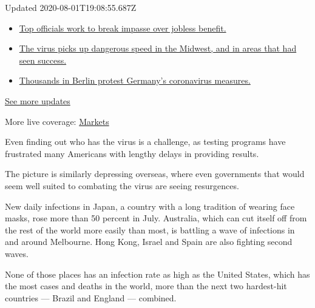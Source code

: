 Updated 2020-08-01T19:08:55.687Z

\begin{itemize}
\tightlist
\item
  \href{https://www.nytimes3xbfgragh.onion/2020/08/01/world/coronavirus-covid-19.html?action=click\&pgtype=Article\&state=default\&region=MAIN_CONTENT_1\&context=storylines_live_updates\#link-3ac56579}{Top
  officials work to break impasse over jobless benefit.}
\item
  \href{https://www.nytimes3xbfgragh.onion/2020/08/01/world/coronavirus-covid-19.html?action=click\&pgtype=Article\&state=default\&region=MAIN_CONTENT_1\&context=storylines_live_updates\#link-8796723}{The
  virus picks up dangerous speed in the Midwest, and in areas that had
  seen success.}
\item
  \href{https://www.nytimes3xbfgragh.onion/2020/08/01/world/coronavirus-covid-19.html?action=click\&pgtype=Article\&state=default\&region=MAIN_CONTENT_1\&context=storylines_live_updates\#link-25930521}{Thousands
  in Berlin protest Germany's coronavirus measures.}
\end{itemize}

\href{https://www.nytimes3xbfgragh.onion/2020/08/01/world/coronavirus-covid-19.html?action=click\&pgtype=Article\&state=default\&region=MAIN_CONTENT_1\&context=storylines_live_updates}{See
more updates}

More live coverage:
\href{https://www.nytimes3xbfgragh.onion/live/2020/07/31/business/stock-market-today-coronavirus?action=click\&pgtype=Article\&state=default\&region=MAIN_CONTENT_1\&context=storylines_live_updates}{Markets}

Even finding out who has the virus is a challenge, as testing programs
have frustrated many Americans with lengthy delays in providing results.

The picture is similarly depressing overseas, where even governments
that would seem well suited to combating the virus are seeing
resurgences.

New daily infections in Japan, a country with a long tradition of
wearing face masks, rose more than 50 percent in July. Australia, which
can cut itself off from the rest of the world more easily than most, is
battling a wave of infections in and around Melbourne. Hong Kong, Israel
and Spain are also fighting second waves.

None of those places has an infection rate as high as the United States,
which has the most cases and deaths in the world, more than the next two
hardest-hit countries --- Brazil and England --- combined.

